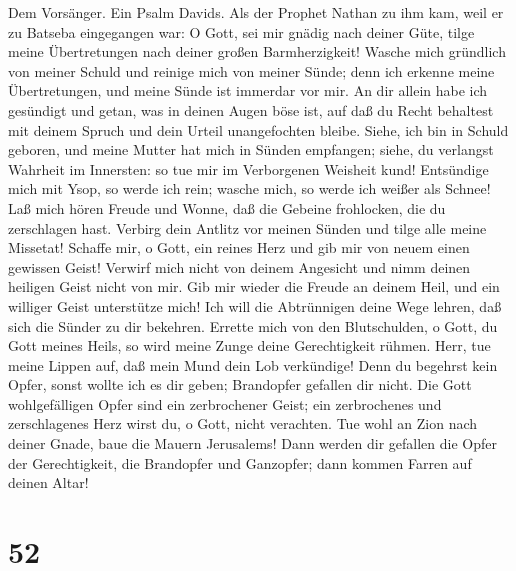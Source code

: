  Dem Vorsänger. Ein Psalm Davids. Als der Prophet Nathan
zu ihm kam, weil er zu Batseba eingegangen war: O Gott, sei mir gnädig
nach deiner Güte, tilge meine Übertretungen nach deiner großen
Barmherzigkeit!  Wasche mich gründlich von meiner Schuld
und reinige mich von meiner Sünde;  denn ich erkenne meine
Übertretungen, und meine Sünde ist immerdar vor mir.  An
dir allein habe ich gesündigt und getan, was in deinen Augen böse ist,
auf daß du Recht behaltest mit deinem Spruch und dein Urteil
unangefochten bleibe.  Siehe, ich bin in Schuld geboren,
und meine Mutter hat mich in Sünden empfangen;  siehe, du
verlangst Wahrheit im Innersten: so tue mir im Verborgenen Weisheit
kund!  Entsündige mich mit Ysop, so werde ich rein; wasche
mich, so werde ich weißer als Schnee!  Laß mich hören
Freude und Wonne, daß die Gebeine frohlocken, die du zerschlagen hast.
 Verbirg dein Antlitz vor meinen Sünden und tilge alle
meine Missetat!  Schaffe mir, o Gott, ein reines Herz und
gib mir von neuem einen gewissen Geist!  Verwirf mich
nicht von deinem Angesicht und nimm deinen heiligen Geist nicht von mir.
 Gib mir wieder die Freude an deinem Heil, und ein
williger Geist unterstütze mich!  Ich will die
Abtrünnigen deine Wege lehren, daß sich die Sünder zu dir bekehren.
 Errette mich von den Blutschulden, o Gott, du Gott
meines Heils, so wird meine Zunge deine Gerechtigkeit rühmen.
 Herr, tue meine Lippen auf, daß mein Mund dein Lob
verkündige!  Denn du begehrst kein Opfer, sonst wollte
ich es dir geben; Brandopfer gefallen dir nicht.  Die
Gott wohlgefälligen Opfer sind ein zerbrochener Geist; ein zerbrochenes
und zerschlagenes Herz wirst du, o Gott, nicht verachten.
 Tue wohl an Zion nach deiner Gnade, baue die Mauern
Jerusalems!  Dann werden dir gefallen die Opfer der
Gerechtigkeit, die Brandopfer und Ganzopfer; dann kommen Farren auf
deinen Altar!

\hypertarget{section-51}{%
\section{52}\label{section-51}}

